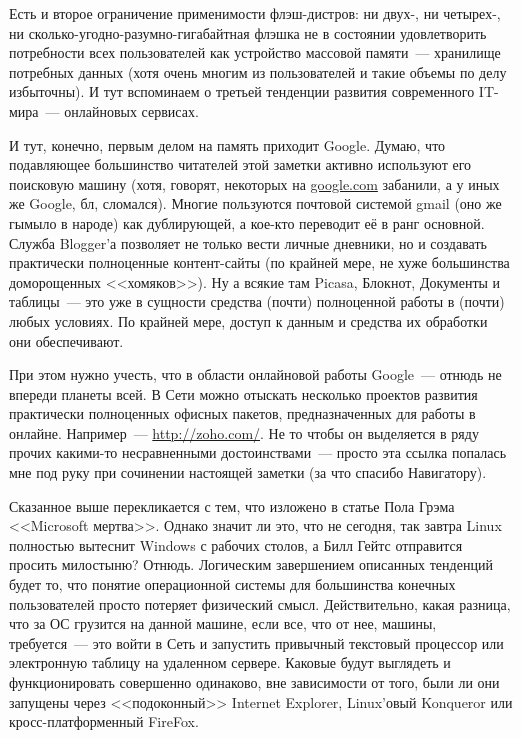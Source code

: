 Есть и второе ограничение применимости флэш-дистров: ни двух-, ни четырех-, ни сколько-угодно-разумно-гигабайтная флэшка не в состоянии удовлетворить потребности всех пользователей как устройство массовой памяти~--- хранилище потребных данных (хотя очень многим из пользователей и такие объемы по делу избыточны). И тут вспоминаем о третьей тенденции развития современного IT-мира~--- онлайновых сервисах.

И тут, конечно, первым делом на память приходит Google. Думаю, что подавляющее большинство читателей этой заметки активно используют его поисковую машину (хотя, говорят, некоторых на \url{google.com} забанили, а у иных же Google, бл, сломался). Многие пользуются почтовой системой gmail (оно же гымыло в народе) как дублирующей, а кое-кто переводит её в ранг основной. Служба Blogger'а позволяет не только вести личные дневники, но и создавать практически полноценные контент-сайты (по крайней мере, не хуже большинства доморощенных <<хомяков>>). Ну а всякие там Picasa, Блокнот, Документы и таблицы~--- это уже в сущности средства (почти) полноценной работы в (почти) любых условиях. По крайней мере, доступ к данным и средства их обработки они обеспечивают.

При этом нужно учесть, что в области онлайновой работы Google~--- отнюдь не впереди планеты всей. В Сети можно отыскать несколько проектов развития практически полноценных офисных пакетов, предназначенных для работы в онлайне. Например~--- \url{http://zoho.com/}. Не то чтобы он выделяется в ряду прочих какими-то несравненными достоинствами~--- просто эта ссылка попалась мне под руку при сочинении настоящей заметки (за что спасибо Навигатору).

Сказанное выше перекликается с тем, что изложено в статье Пола Грэма <<Microsoft мертва>>. Однако значит ли это, что не сегодня, так завтра Linux полностью вытеснит Windows с рабочих столов, а Билл Гейтс отправится просить милостыню? Отнюдь. Логическим завершением описанных тенденций будет то, что понятие операционной системы для большинства конечных пользователей просто потеряет физический смысл. Действительно, какая разница, что за ОС грузится на данной машине, если все, что от нее, машины, требуется~--- это войти в Сеть и запустить привычный текстовый процессор или электронную таблицу на удаленном сервере. Каковые будут выглядеть и функционировать совершенно одинаково, вне зависимости от того, были ли они запущены через <<подоконный>> Internet Explorer, Linux'овый Konqueror или кросс-платформенный FireFox.

